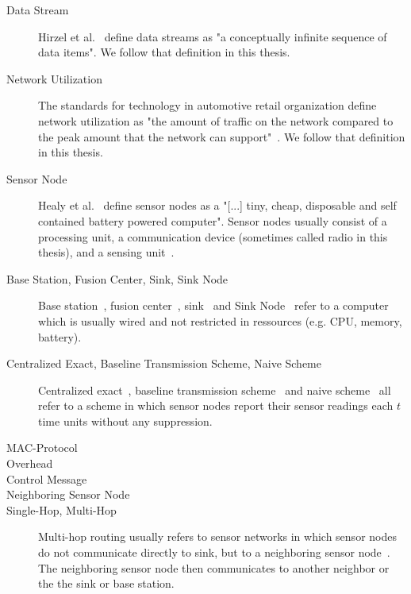 \begin{description}

    \item[Data Stream]
        Hirzel et al.~\cite{hirzel2014catalog} define data streams as "a
        conceptually infinite sequence of data items". We follow that
        definition in this thesis.
    \item[Network Utilization]
        The standards for technology in automotive retail organization define
        network utilization as "the amount of traffic on the network compared
        to the peak amount that the network can support"~\cite{networkutil}. We
        follow that definition in this thesis.

    \item[Sensor Node]
        Healy et al.~\cite{healy2008wireless} define sensor nodes as a "[...]
        tiny, cheap, disposable and self contained battery powered computer".
        Sensor nodes usually consist of a processing unit, a communication
        device (sometimes called radio in this thesis), and a sensing
        unit~\cite{akyildiz2002wireless}.

    \item[Base Station, Fusion Center, Sink, Sink Node]
        Base station~\cite{padhy2006utility}, fusion
        center~\cite{willett2004backcasting}, sink~\cite{alippi2009energy} and
        Sink Node~\cite{chen2013sink} refer to a computer which is usually
        wired and not restricted in ressources (e.g. CPU, memory, battery).

    \item[Centralized Exact, Baseline Transmission Scheme, Naive Scheme]
        Centralized exact~\cite{gedik2007asap}, baseline transmission
        scheme~\cite{luo2009compressive} and naive
        scheme~\cite{cheng2010efficient} all refer to a scheme in which sensor
        nodes report their sensor readings each $ t $ time units without any
        suppression. 

    \item[\ac{MAC}-Protocol]
        

    \item[Overhead]
        

    \item[Control Message]
        

    \item[Neighboring Sensor Node]
        

    \item[Single-Hop, Multi-Hop]
        Multi-hop routing usually refers to sensor networks in which sensor
        nodes do not communicate directly to sink, but to a neighboring sensor
        node~\cite{yaacoub2012multihop}. The neighboring sensor node then
        communicates to another neighbor or the the sink or base station.


\end{description}
